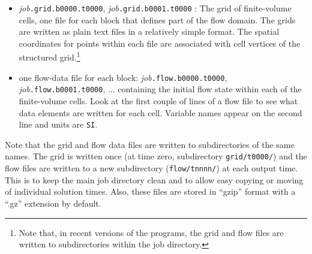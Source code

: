 \documentclass[12pt,a4paper,twoside]{article}
\begin{document}
\begin{itemize}
           \item \textit{job}\texttt{.grid.b0000.t0000}, \textit{job}\texttt{.grid.b0001.t0000} :
             The grid of finite-volume cells, 
             one file for each block that defines part of the flow domain.
             The grids are written as plain text files in a relatively simple format.
             The spatial coordinates for points within each file are
             associated with cell vertices of the structured grid.\footnote{Note that, in recent versions of the programs, 
             the grid and flow files are written to subdirectories within the job directory.}
           \item one flow-data file for each block:
             \textit{job}\texttt{.flow.b0000.t0000}, \textit{job}\texttt{.flow.b0001.t0000}, ...
             containing the initial flow state within each of the finite-volume cells.
             Look at the first couple of lines of a flow file to see what data elements are written for each cell.
             Variable names appear on the second line and units are \texttt{SI}.
         \end{itemize}
         Note that the grid and flow data files are written to subdirectories of the same names.
         The grid is written once (at time zero, subdirectory \texttt{grid/t0000/}) and 
         the flow files are written to a new subdirectory (\texttt{flow/tnnnn/}) at each output time.
         This is to keep the main job directory clean and to allow easy copying or moving of 
         individual solution times.
         Also, these files are stored in ``gzip'' format with a ``.gz'' extension by default.

\newpage
\end{document}
